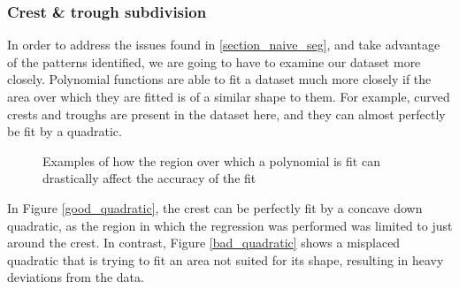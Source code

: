 \documentclass[12pt, a4paper]{article}
\begin{document}
\subsubsection{Crest \& trough subdivision}
\label{crest_trough_subdivision}
In order to address the issues found in \ref{section_naive_seg}, and take
advantage of the patterns identified, we are going to have to examine our
dataset more closely. Polynomial functions are able to fit a dataset
much more closely if the area over which they are fitted is of a similar shape
to them. For example, curved crests and troughs are present in the dataset here,
and they can almost perfectly be fit by a quadratic.

\begin{figure}[H]
    \centering
    \caption{ Examples of how the region over which a polynomial is fit can
        drastically affect the accuracy of the fit }
    \label{bad_good_quadratics}
\end{figure}

In Figure \ref{good_quadratic}, the crest can be perfectly fit by a concave down
quadratic, as the region in which the regression was performed was limited to
just around the crest. In contrast, Figure \ref{bad_quadratic} shows a misplaced
quadratic that is trying to fit an area not suited for its shape, resulting in
heavy deviations from the data.
\end{document}
